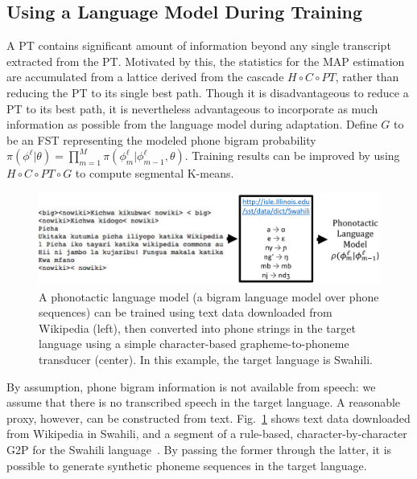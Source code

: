 \subsection{Using a Language Model During Training}
\label{sec:trainwithlm}

A PT contains significant amount of information beyond any single
transcript extracted from the PT. Motivated by this, the statistics
for the MAP estimation are accumulated from a lattice derived from the
cascade $H\circ C \circ PT$, rather than reducing the PT to its single
best path. Though it is disadvantageous to reduce a PT to its best
path, it is nevertheless advantageous to incorporate as much
information as possible from the language model during adaptation.
Define $G$ to be an FST representing the modeled phone bigram
probability
$\pi(\phi^\ell|\theta)=\prod_{m=1}^M\pi(\phi_m^\ell|\phi_{m-1}^\ell,\theta)$.
Training results can be improved by using $H\circ C\circ PT\circ G$ to
compute segmental K-means.

\begin{figure}
  \centerline{\includegraphics[width=5in]{../figs/fig_sloan.png}}
  \caption{A phonotactic language model (a bigram language model over
    phone sequences) can be trained using text data downloaded from
    Wikipedia (left), then converted into phone strings in the target
    language using a simple character-based grapheme-to-phoneme
    transducer (center).  In this example, the target language is
    Swahili.}
  \label{fig:wikitext}
\end{figure}

By assumption, phone bigram information is not available from speech:
we assume that there is no transcribed speech in the target language.
A reasonable proxy, however, can be constructed from text.
Fig.~\ref{fig:wikitext} shows text data downloaded from Wikipedia in
Swahili, and a segment of a rule-based, character-by-character G2P for
the Swahili language~\cite{Hasegawajohnson15}.  By passing the former
through the latter, it is possible to generate synthetic phoneme
sequences in the target language.


